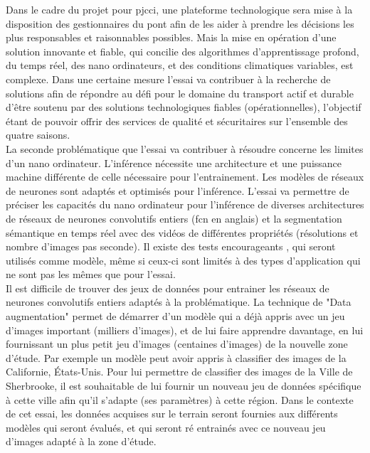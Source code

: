 ﻿\noindent Dans le cadre du projet pour \acrshort{pjcci}, une plateforme technologique sera mise à la disposition des gestionnaires du pont afin de les aider à prendre les décisions les plus responsables et raisonnables possibles. Mais la mise en opération d'une solution innovante et fiable, qui concilie des algorithmes d'apprentissage profond, du temps réel, des nano ordinateurs, et des conditions climatiques variables, est complexe. Dans une certaine mesure l'essai va contribuer à la recherche de solutions afin de répondre au défi pour le domaine du transport actif et durable d'être soutenu par des solutions technologiques fiables (opérationnelles), l'objectif étant de pouvoir offrir des services de qualité et sécuritaires sur l'ensemble des quatre saisons.
\vspace{\baselineskip}
\\
\noindent La seconde problématique que l'essai va contribuer à résoudre concerne les limites d'un nano ordinateur. L'inférence nécessite une architecture et une puissance machine différente de celle nécessaire pour l'entrainement. Les modèles de réseaux de neurones sont adaptés et optimisés pour l'inférence. L'essai va permettre de préciser les capacités du nano ordinateur pour l'inférence de diverses architectures de réseaux de neurones convolutifs entiers (\acrshort{fcn} en anglais) et la segmentation sémantique en temps réel avec des vidéos de différentes propriétés (résolutions et nombre d'images pas seconde). Il existe des tests encourageants \parencite{nvidia_jetson_2019-1} \parencite{nguyen_mavnet_2019} \parencite{chong_real-time_1992}, qui seront utilisés comme modèle, même si ceux-ci sont limités à des types d'application qui ne sont pas les mêmes que pour l'essai.
\vspace{\baselineskip}
\\
\noindent Il est difficile de trouver des jeux de données pour entrainer les réseaux de neurones convolutifs entiers adaptés à la problématique. La technique de "Data augmentation" permet de démarrer d'un modèle qui a déjà appris avec un jeu d'images important (milliers d'images), et de lui faire apprendre davantage, en lui fournissant un plus petit jeu d'images (centaines d'images) de la nouvelle zone d'étude. Par exemple un modèle peut avoir appris à classifier des images de la Californie, États-Unis. Pour lui permettre de classifier des images de la Ville de Sherbrooke, il est souhaitable de lui fournir un nouveau jeu de données spécifique à cette ville afin qu'il s'adapte (ses paramètres) à cette région. Dans le contexte de cet essai, les données acquises sur le terrain seront fournies aux différents modèles qui seront évalués, et qui seront ré entrainés avec ce nouveau jeu d'images adapté à la zone d'étude.
